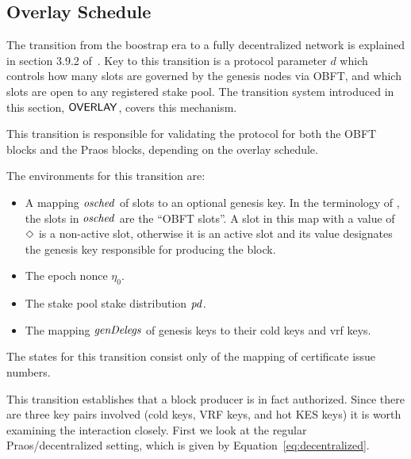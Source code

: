 \clearpage

\subsection{Overlay Schedule}
\label{sec:overlay-schedule}

The transition from the boostrap era to a fully decentralized network is explained in
section 3.9.2 of~\cite{delegation_design}.
Key to this transition is a protocol parameter $d$ which controls how many slots are governed by
the genesis nodes via OBFT, and which slots are open to any registered stake pool.
The transition system introduced in this section, $\mathsf{OVERLAY}$, covers this mechanism.

This transition is responsible for validating the protocol for both the OBFT blocks
and the Praos blocks, depending on the overlay schedule.

The environments for this transition are:
\begin{itemize}
  \item A mapping $\mathit{osched}$ of slots to an optional genesis key.
    In the terminology of \cite{delegation_design},
    the slots in $\mathit{osched}$ are the ``OBFT slots''.
    A slot in this map with a value of $\Diamond$ is a non-active slot,
    otherwise it is an active slot and its value designates the genesis key
    responsible for producing the block.
  \item The epoch nonce $\eta_0$.
  \item The stake pool stake distribution $\mathit{pd}$.
  \item The mapping $\mathit{genDelegs}$ of genesis keys to their cold keys and vrf keys.
\end{itemize}

The states for this transition consist only of the mapping of certificate issue numbers.

This transition establishes that a block producer is in fact authorized.
Since there are three key pairs involved (cold keys, VRF keys, and hot KES keys)
it is worth examining the interaction closely.
First we look at the regular Praos/decentralized setting,
which is given by Equation~\ref{eq:decentralized}.

